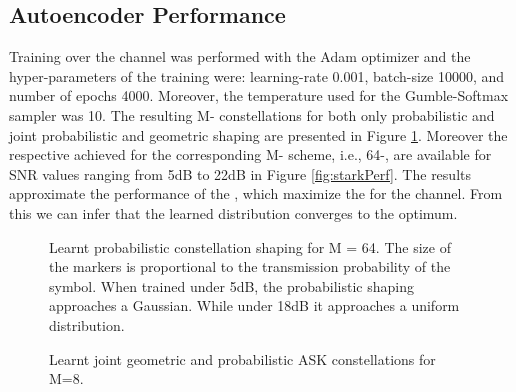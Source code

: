 \subsection{Autoencoder Performance}
Training over the  channel was performed with the Adam optimizer and the hyper-parameters of the training were: learning-rate 0.001, batch-size 10000, and number of epochs 4000. Moreover, the temperature used for the Gumble-Softmax sampler was 10.
The resulting M- constellations for both only probabilistic and joint probabilistic and geometric shaping are presented in Figure \ref{fig:starkMASK}. Moreover the respective achieved  for the corresponding M- scheme, i.e., 64-, are available for SNR values ranging from 5dB to 22dB in Figure \ref{fig:starkPerf}. The results approximate the performance of the , which maximize the  for the  channel. From this we can infer that the learned distribution converges to the optimum.

\begin{figure}[h]
	\subfigure[5dB]{
		
		\label{subfig:stark_pcs_5db}
	}
	\subfigure[18db]{
		
		\label{subfig:stark_pcs_18db}
	}
	\caption{Learnt probabilistic constellation shaping for M = 64. The size of the markers is proportional to the transmission probability of the symbol. When trained under 5dB, the probabilistic shaping approaches a Gaussian. While under 18dB it approaches a uniform distribution. }
\end{figure}
	
\begin{figure}[h]
	\subfigure[SNR = 5dB]{
         
         \label{subfig:stark5dB}
    }
%         
%         
    \subfigure[SNR = 18dB]{
         
         \label{subfig:stark18dB}
    }
    \caption{Learnt joint geometric and probabilistic ASK constellations for M=8.}
    \label{fig:starkMASK}
\end{figure}


